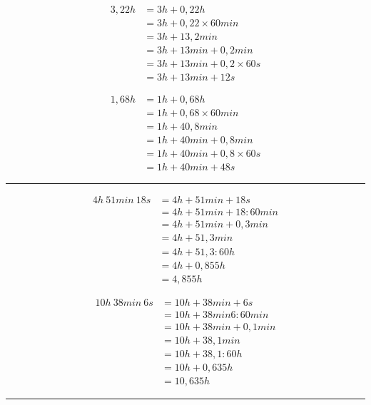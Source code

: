 \begin{multicols}{2}
    \exo{}{} %
    \begin{align*}
        3,22h&=3h+0,22h\\
        &=3h+0,22\times 60 min\\
        &=3h+13,2 min\\
        &=3h+13 min+0,2 min\\
        &=3h+13 min+0,2 \times 60 s\\
        &=3h+13 min+12 s
    \end{align*}

    \exo{}{} %
    \begin{align*}
        1,68h&=1h+0,68h\\
        &=1h+0,68\times 60 min\\
        &=1h+40,8 min\\
        &=1h+40 min+0,8 min\\
        &=1h+40 min+0,8 \times 60 s\\
        &=1h+40 min+48 s
    \end{align*}

\end{multicols}
\hrule \vspace{-0.5em}%


\begin{multicols}{2}
    \exo{}{} %
    \begin{align*}
        4h~51min~18s&=4h+51min+18s\\
        &=4h+51min+18:60min\\
        &=4h+51min+0,3min\\
        &=4h+51,3min\\
        &=4h+51,3:60h\\
        &=4h+0,855h\\
        &=4,855h
    \end{align*}

    \exo{}{} %
    \begin{align*}
        10h~38min~6s&=10h+38min+6s\\
        &=10h+38min6:60min\\
        &=10h+38min+0,1min\\
        &=10h+38,1min\\
        &=10h+38,1:60h\\
        &=10h+0,635h\\
        &=10,635h
    \end{align*}

\end{multicols}

\hrule \vspace{-0.5em}%
